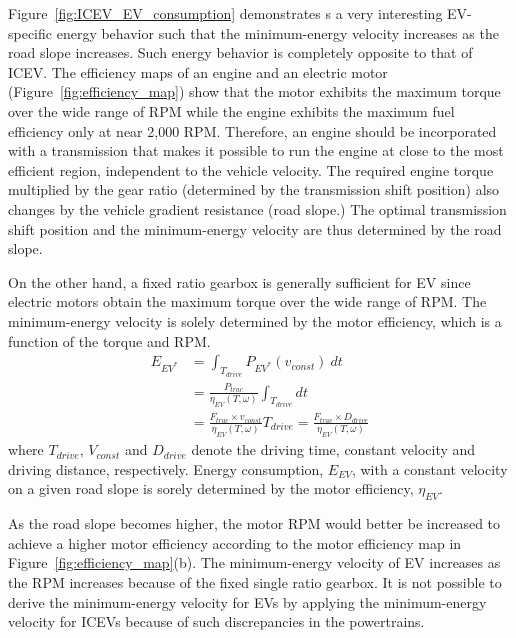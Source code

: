 \documentclass{IEEEtran}
\begin{document}
Figure~\ref{fig:ICEV_EV_consumption} demonstrates s a very interesting EV-specific energy behavior such that the minimum-energy velocity increases as the road slope increases. Such energy behavior is completely opposite to that of ICEV. 
%
The efficiency maps of an  engine and an electric motor (Figure~\ref{fig:efficiency_map}) show that the motor exhibits  the maximum torque over the wide range of RPM while the engine exhibits the maximum fuel efficiency only at near 2,000 RPM. Therefore, an engine should be incorporated with a transmission that makes it possible to run the engine at close to the most efficient region, independent to the vehicle velocity. The required engine torque multiplied by the gear ratio (determined by the transmission shift position) also changes by the vehicle gradient resistance (road slope.) The optimal  transmission shift position and the minimum-energy velocity are thus determined by the road slope.

On the other hand, a fixed ratio gearbox is generally sufficient for EV since electric motors obtain the maximum torque over the wide range of RPM. The minimum-energy velocity is solely determined by the motor efficiency, which is a function of the torque and RPM. 
%
\begin{align}
E_{EV^*} 	&= \int_{T_{drive}} P_{EV^*}(v_{const})~dt \nonumber\\
		&= \frac{P_{trac}}{\eta_{EV}(T, \omega)} \int_{T_{drive}} dt  \nonumber\\
		&= \frac{F_{trac} \times v_{const}}{\eta_{EV}(T, \omega)} T_{drive}
		= \frac{F_{trac} \times D_{drive}}{\eta_{EV}(T, \omega)} \nonumber
\end{align}
where $T_{drive}$, $V_{const}$ and $D_{drive}$ denote the driving time, constant velocity and driving distance, respectively. Energy consumption, $E_{EV}$, with a constant velocity on a given road slope is sorely determined by the motor efficiency, $\eta_{EV}$. 

As the road slope becomes higher, the motor RPM would better be increased to achieve a higher motor efficiency according to the motor efficiency map in Figure~\ref{fig:efficiency_map}(b). The minimum-energy velocity of EV increases as the RPM increases because of the fixed single ratio gearbox. It is not possible to derive the minimum-energy velocity for EVs by applying  the minimum-energy velocity for ICEVs because of such discrepancies in the powertrains.
\end{document}
